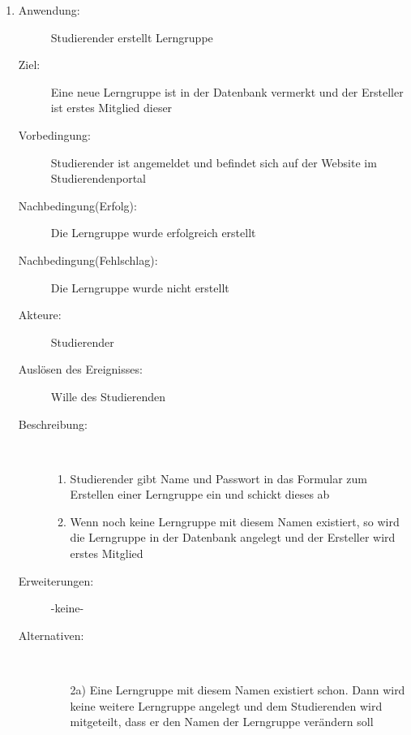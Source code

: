 \documentclass[parskip=full]{scrartcl}
\newcommand{\swtLabel}[1]{\textbf{\textbackslash #1\arabic*0\textbackslash}}
\begin{document}
\begin{enumerate}[label=\swtLabel{S}]
  
  \item
  \begin{description}
  \item[Anwendung:] Studierender erstellt Lerngruppe
  \item[Ziel:] Eine neue Lerngruppe ist in der Datenbank vermerkt und der Ersteller ist erstes Mitglied dieser
  	\item[Vorbedingung:] Studierender ist angemeldet und befindet sich auf der
  	Website im Studierendenportal
  	\item[Nachbedingung(Erfolg):] Die Lerngruppe wurde erfolgreich erstellt
  	\item[Nachbedingung(Fehlschlag):] Die Lerngruppe wurde nicht erstellt
  	\item[Akteure:] Studierender
  	\item[Auslösen des Ereignisses:] Wille des Studierenden
  	\item[Beschreibung:]~
  	\begin{enumerate}
  	  \item Studierender gibt Name und Passwort in das Formular zum Erstellen
  	  einer Lerngruppe ein und schickt dieses ab
  	  \item Wenn noch keine Lerngruppe mit diesem Namen existiert, so wird die
  	  Lerngruppe in der Datenbank angelegt und der Ersteller wird erstes Mitglied
  	\end{enumerate}
  	\item[Erweiterungen:] -keine-
  	\item[Alternativen:] ~
  	\begin{enumerate}
  	  \item[2a)] Eine Lerngruppe mit diesem Namen existiert schon. Dann wird
  	  keine weitere Lerngruppe angelegt und dem Studierenden wird mitgeteilt,
  	  dass er den Namen der Lerngruppe verändern soll
  	 \end{enumerate}  
  \end{description}
   

\end{enumerate}
\end{document}
